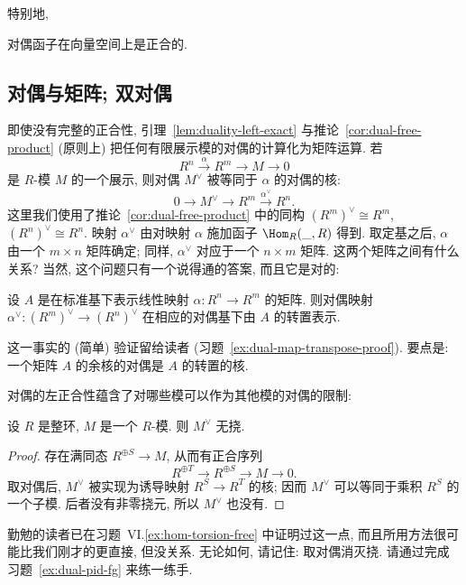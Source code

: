 特别地,

\begin{corollary}\label{cor:duality-exact-vect}
对偶函子在向量空间上是正合的.
\end{corollary}

\subsection{对偶与矩阵; 双对偶}\label{subsec:duals-matrices-biduality}

即使没有完整的正合性, 引理~\ref{lem:duality-left-exact} 与推论~\ref{cor:dual-free-product} (原则上) 把任何有限展示模的对偶的计算化为矩阵运算. 若
\[
R^n\xrightarrow{\alpha} R^m\longrightarrow M\longrightarrow 0
\]
是 $R$-模 $M$ 的一个展示, 则对偶 $M^\vee$ 被等同于 $\alpha$ 的对偶的核:
\[
0\longrightarrow M^\vee\longrightarrow R^m\xrightarrow{\alpha^\vee} R^n.
\]
这里我们使用了推论~\ref{cor:dual-free-product} 中的同构 $(R^m)^\vee\cong R^m$, $(R^n)^\vee\cong R^n$. 映射 $\alpha^\vee$ 由对映射 $\alpha$ 施加函子 $\Hom_R(\_,R)$ 得到. 取定基之后, $\alpha$ 由一个 $m\times n$ 矩阵确定; 同样, $\alpha^\vee$ 对应于一个 $n\times m$ 矩阵. 这两个矩阵之间有什么关系? 当然, 这个问题只有一个说得通的答案, 而且它是对的:

\begin{lemma}\label{lem:dual-map-transpose}
设 $A$ 是在标准基下表示线性映射 $\alpha:R^n\to R^m$ 的矩阵. 则对偶映射 $\alpha^\vee:(R^m)^\vee\to(R^n)^\vee$ 在相应的对偶基下由 $A$ 的转置表示.
\end{lemma}

这一事实的 (简单) 验证留给读者 (习题~\ref{ex:dual-map-transpose-proof}). 要点是: 一个矩阵 $A$ 的余核的对偶是 $A$ 的转置的核.

对偶的左正合性蕴含了对哪些模可以作为其他模的对偶的限制:

\begin{proposition}\label{prop:dual-torsion-free}
设 $R$ 是整环, $M$ 是一个 $R$-模. 则 $M^\vee$ 无挠.
\end{proposition}

\begin{proof}
存在满同态 $R^{\oplus S}\to M$, 从而有正合序列
\[
R^{\oplus T}\to R^{\oplus S}\to M\to 0.
\]
取对偶后, $M^\vee$ 被实现为诱导映射 $R^S\to R^T$ 的核; 因而 $M^\vee$ 可以等同于乘积 $R^S$ 的一个子模. 后者没有非零挠元, 所以 $M^\vee$ 也没有.
\end{proof}

勤勉的读者已在习题~VI.\ref{ex:hom-torsion-free} 中证明过这一点, 而且所用方法很可能比我们刚才的更直接, 但没关系. 无论如何, 请记住: 取对偶消灭挠. 请通过完成习题~\ref{ex:dual-pid-fg} 来练一练手.

